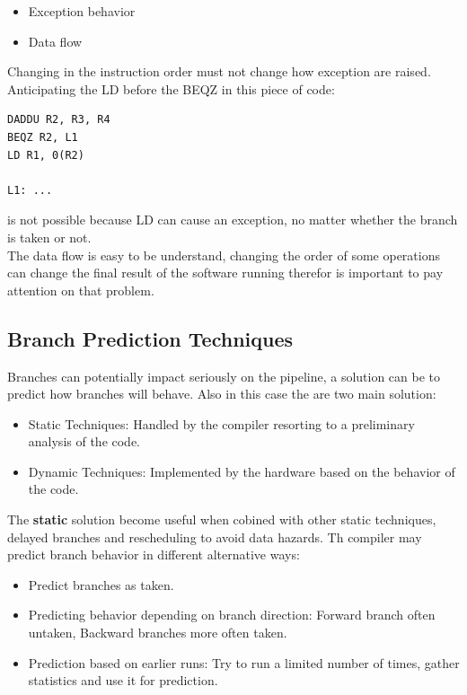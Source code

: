 \documentclass[12pt]{article}
\begin{document}
\begin{itemize}
  \item Exception behavior
  \item Data flow
\end{itemize}
Changing in the instruction order must not change how exception are raised. Anticipating the LD before the BEQZ in this piece of code:
\begin{lstlisting}
DADDU R2, R3, R4
BEQZ R2, L1
LD R1, 0(R2)

L1: ...
\end{lstlisting}
is not possible because LD can cause an exception, no matter whether the branch is taken or not.\\
The data flow is easy to be understand, changing the order of some operations can change the final result of the software running therefor is important to pay attention on that problem.

\subsection{Branch Prediction Techniques}
Branches can potentially impact seriously on the pipeline, a solution can be to predict how branches will behave. Also in this case the are two main solution:
\begin{itemize}
  \item Static Techniques: Handled by the compiler resorting to a preliminary analysis of the code.
  \item Dynamic Techniques: Implemented by the hardware based on the behavior of the code.
\end{itemize}
The \textbf{static} solution become useful when cobined with other static techniques, delayed branches and rescheduling to avoid data hazards.
Th compiler may predict branch behavior in different alternative ways:
\begin{itemize}
  \item Predict branches as taken.
  \item Predicting behavior depending on branch direction: Forward branch often untaken, Backward branches more often taken.
  \item Prediction based on earlier runs: Try to run a limited number of times, gather statistics and use it for prediction.
\end{itemize}
\end{document}

